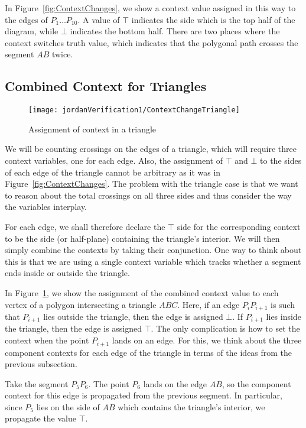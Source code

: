 In Figure~\ref{fig:ContextChanges}, we show a context value assigned in this way to the edges of $P_1\ldots P_{10}$. A value of $\top$ indicates the side which is the top half of the diagram, while $\bot$ indicates the bottom half. There are two places where the context switches truth value, which indicates that the polygonal path crosses the segment $AB$ twice.

\subsection{Combined Context for Triangles}
\begin{figure}
\centering\texttt{[image: jordanVerification1/ContextChangeTriangle]}
\caption{Assignment of context in a triangle}
\label{fig:ContextChangesTriangle}
\end{figure}

We will be counting crossings on the edges of a triangle, which will require three context variables, one for each edge. Also, the assignment of $\top$ and $\bot$ to the sides of each edge of the triangle cannot be arbitrary as it was in Figure~\ref{fig:ContextChanges}. The problem with the triangle case is that we want to reason about the total crossings on all three sides and thus consider the way the variables interplay.

For each edge, we shall therefore declare the $\top$ side for the corresponding context to be the side (or half-plane) containing the triangle's interior. We will then simply combine the contexts by taking their conjunction. One way to think about this is that we are using a single context variable which tracks whether a segment ends inside or outside the triangle.

In Figure~\ref{fig:ContextChangesTriangle}, we show the assignment of the combined context value to each vertex of a polygon intersecting a triangle $ABC$. Here, if an edge $P_iP_{i+1}$ is such that $P_{i+1}$ lies outside the triangle, then the edge is assigned $\bot$. If $P_{i+1}$ lies inside the triangle, then the edge is assigned $\top$. The only complication is how to set the context when the point $P_{i+1}$ lands on an edge. For this, we think about the three component contexts for each edge of the triangle in terms of the ideas from the previous subsection.

Take the segment $P_5P_6$. The point $P_6$ lands on the edge $AB$, so the component context for this edge is propagated from the previous segment. In particular, since $P_5$ lies on the side of $AB$ which contains the triangle's interior, we propagate the value $\top$.

